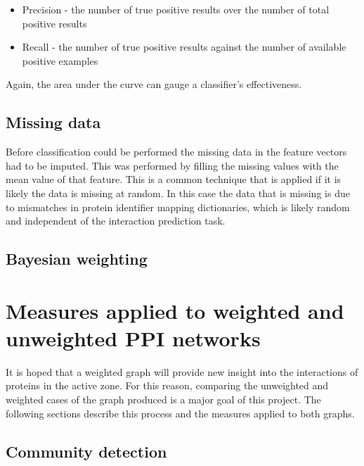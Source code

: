 \begin{itemize}
    \item Precision - the number of true positive results over the number of total positive results
    \item Recall - the number of true positive results against the number of available positive examples
\end{itemize}

Again, the area under the curve can gauge a classifier's effectiveness.


\subsection{Missing data}
Before classification could be performed the missing data in the feature vectors had to be imputed.
This was performed by filling the missing values with the mean value of that feature.
This is a common technique that is applied if it is likely the data is missing at random.
In this case the data that is missing is due to mismatches in protein identifier mapping dictionaries, which is likely random and independent of the interaction prediction task.

\subsection{Bayesian weighting}
\label{bayes}







\section{Measures applied to weighted and unweighted PPI networks}

It is hoped that a weighted graph will provide new insight into the interactions of proteins in the active zone.
For this reason, comparing the unweighted and weighted cases of the graph produced is a major goal of this project.
The following sections describe this process and the measures applied to both graphs.

\subsection{Community detection}


